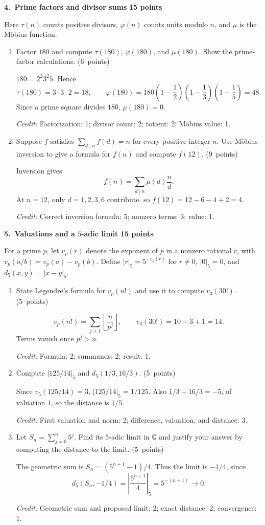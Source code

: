\documentclass[11pt,letterpaper]{article}
\newcommand{\partpts}[1]{\unskip\nobreak\hspace{.3em}%
  \mbox{\small\color{muted}(#1 points)}}
\newcommand{\credit}[1]{\par{\footnotesize\color{muted}\textit{Credit:} #1}}
\newcommand{\problem}[3]{\par\addvspace{9pt}%
  {\large\bfseries\color{indigo}#1.\ #2}\hfill
  {\small\color{muted}\textbf{#3 points}}\par\nobreak}
\begin{document}
\problem{4}{Prime factors and divisor sums}{15}
Here $\tau(n)$ counts positive divisors, $\varphi(n)$ counts units modulo
$n$, and $\mu$ is the M\"obius function.
\begin{enumerate}
\item Factor $180$ and compute $\tau(180)$, $\varphi(180)$,
and $\mu(180)$. Show the prime-factor calculations. \partpts{6}
\begin{solution}[1in]
$180=2^2 3^2 5$. Hence
\[
\tau(180)=3\cdot3\cdot2=18,\qquad
\varphi(180)=180\left(1-\frac12\right)\left(1-\frac13\right)
\left(1-\frac15\right)=48.
\]
Since a prime square divides $180$, $\mu(180)=0$.
\credit{Factorization: 1; divisor count: 2; totient: 2; M\"obius value: 1.}
\end{solution}
\item Suppose $f$ satisfies $\sum_{d\mid n}f(d)=n$ for every positive
integer $n$. Use M\"obius inversion to give a formula for $f(n)$ and
compute $f(12)$. \partpts{9}
\begin{solution}[1.2in]
Inversion gives
\[
f(n)=\sum_{d\mid n}\mu(d)\frac nd.
\]
At $n=12$, only $d=1,2,3,6$ contribute, so
$f(12)=12-6-4+2=4$.
\credit{Correct inversion formula: 5; nonzero terms: 3; value: 1.}
\end{solution}
\end{enumerate}

\newpage
\problem{5}{Valuations and a $5$-adic limit}{15}
For a prime $p$, let $v_p(r)$ denote the exponent of $p$ in a nonzero
rational $r$, with $v_p(a/b)=v_p(a)-v_p(b)$. Define
$|r|_5=5^{-v_5(r)}$ for $r\ne0$, $|0|_5=0$, and $d_5(x,y)=|x-y|_5$.
\begin{enumerate}
\item State Legendre's formula for $v_p(n!)$ and use it to compute
$v_3(30!)$. \partpts{5}
\begin{solution}[1.45in]
\[
v_p(n!)=\sum_{j\ge1}\left\lfloor\frac{n}{p^j}\right\rfloor,
\qquad v_3(30!)=10+3+1=14.
\]
Terms vanish once $p^j>n$.
\credit{Formula: 2; summands: 2; result: 1.}
\end{solution}
\item Compute $|125/14|_5$ and $d_5(1/3,16/3)$. \partpts{5}
\begin{solution}[1.45in]
Since $v_5(125/14)=3$, $|125/14|_5=1/125$.
Also $1/3-16/3=-5$, of valuation $1$, so the distance is $1/5$.
\credit{First valuation and norm: 2; difference, valuation, and distance: 3.}
\end{solution}
\item Let $S_n=\sum_{j=0}^n5^j$. Find its $5$-adic limit in
$\mathbb Q$ and justify your answer by computing the distance to the limit.
\partpts{5}
\begin{solution}[2in]
The geometric sum is $S_n=(5^{n+1}-1)/4$. Thus the limit is $-1/4$,
since
\[
d_5(S_n,-1/4)=\left|\frac{5^{n+1}}4\right|_5
=5^{-(n+1)}\longrightarrow0.
\]
\credit{Geometric sum and proposed limit: 2; exact distance: 2; convergence: 1.}
\end{solution}
\end{enumerate}
\end{document}
